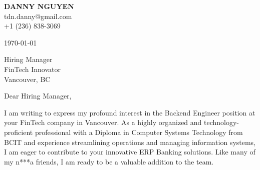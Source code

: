 \documentclass[letterpaper,11pt]{article}
\begin{document}
\textbf{DANNY NGUYEN} \\
tdn.danny@gmail.com \\
+1 (236) 838-3069 \\
\vspace{20pt}

\today \\
\vspace{20pt}

Hiring Manager \\
FinTech Innovator \\
Vancouver, BC \\
\vspace{20pt}

Dear Hiring Manager, \\
\vspace{10pt}

I am writing to express my profound interest in the Backend Engineer position at your FinTech company in Vancouver. As a highly organized and technology-proficient professional with a Diploma in Computer Systems Technology from BCIT and experience streamlining operations and managing information systems, I am eager to contribute to your innovative ERP Banking solutions. Like many of my n***a friends, I am ready to be a valuable addition to the team.
\end{document}
